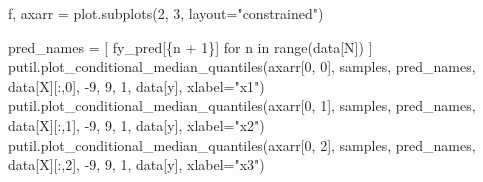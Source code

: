 \documentclass[
  letterpaper,
  DIV=11,
  numbers=noendperiod]{scrartcl}
\newenvironment{Shaded}{\begin{snugshade}}{\end{snugshade}}
\newcommand{\BuiltInTok}[1]{\textcolor[rgb]{0.00,0.23,0.31}{#1}}
\newcommand{\ControlFlowTok}[1]{\textcolor[rgb]{0.00,0.23,0.31}{#1}}
\newcommand{\DecValTok}[1]{\textcolor[rgb]{0.68,0.00,0.00}{#1}}
\newcommand{\KeywordTok}[1]{\textcolor[rgb]{0.00,0.23,0.31}{#1}}
\newcommand{\NormalTok}[1]{\textcolor[rgb]{0.00,0.23,0.31}{#1}}
\newcommand{\OperatorTok}[1]{\textcolor[rgb]{0.37,0.37,0.37}{#1}}
\newcommand{\SpecialCharTok}[1]{\textcolor[rgb]{0.37,0.37,0.37}{#1}}
\newcommand{\SpecialStringTok}[1]{\textcolor[rgb]{0.13,0.47,0.30}{#1}}
\newcommand{\StringTok}[1]{\textcolor[rgb]{0.13,0.47,0.30}{#1}}
\begin{document}
\begin{Shaded}
\begin{Highlighting}[]
\NormalTok{f, axarr }\OperatorTok{=}\NormalTok{ plot.subplots(}\DecValTok{2}\NormalTok{, }\DecValTok{3}\NormalTok{, layout}\OperatorTok{=}\StringTok{"constrained"}\NormalTok{)}

\NormalTok{pred\_names }\OperatorTok{=}\NormalTok{ [ }\SpecialStringTok{f\textquotesingle{}y\_pred[}\SpecialCharTok{\{}\NormalTok{n }\OperatorTok{+} \DecValTok{1}\SpecialCharTok{\}}\SpecialStringTok{]\textquotesingle{}} \ControlFlowTok{for}\NormalTok{ n }\KeywordTok{in} \BuiltInTok{range}\NormalTok{(data[}\StringTok{\textquotesingle{}N\textquotesingle{}}\NormalTok{]) ]}
\NormalTok{putil.plot\_conditional\_median\_quantiles(axarr[}\DecValTok{0}\NormalTok{, }\DecValTok{0}\NormalTok{], samples, pred\_names,}
\NormalTok{                                        data[}\StringTok{\textquotesingle{}X\textquotesingle{}}\NormalTok{][:,}\DecValTok{0}\NormalTok{], }\OperatorTok{{-}}\DecValTok{9}\NormalTok{, }\DecValTok{9}\NormalTok{, }\DecValTok{1}\NormalTok{,}
\NormalTok{                                        data[}\StringTok{\textquotesingle{}y\textquotesingle{}}\NormalTok{], xlabel}\OperatorTok{=}\StringTok{"x1"}\NormalTok{)}
\NormalTok{putil.plot\_conditional\_median\_quantiles(axarr[}\DecValTok{0}\NormalTok{, }\DecValTok{1}\NormalTok{], samples, pred\_names,}
\NormalTok{                                        data[}\StringTok{\textquotesingle{}X\textquotesingle{}}\NormalTok{][:,}\DecValTok{1}\NormalTok{], }\OperatorTok{{-}}\DecValTok{9}\NormalTok{, }\DecValTok{9}\NormalTok{, }\DecValTok{1}\NormalTok{,}
\NormalTok{                                        data[}\StringTok{\textquotesingle{}y\textquotesingle{}}\NormalTok{], xlabel}\OperatorTok{=}\StringTok{"x2"}\NormalTok{)}
\NormalTok{putil.plot\_conditional\_median\_quantiles(axarr[}\DecValTok{0}\NormalTok{, }\DecValTok{2}\NormalTok{], samples, pred\_names,}
\NormalTok{                                        data[}\StringTok{\textquotesingle{}X\textquotesingle{}}\NormalTok{][:,}\DecValTok{2}\NormalTok{], }\OperatorTok{{-}}\DecValTok{9}\NormalTok{, }\DecValTok{9}\NormalTok{, }\DecValTok{1}\NormalTok{,}
\NormalTok{                                        data[}\StringTok{\textquotesingle{}y\textquotesingle{}}\NormalTok{], xlabel}\OperatorTok{=}\StringTok{"x3"}\NormalTok{)}


\end{Highlighting}
\end{Shaded}
\end{document}
